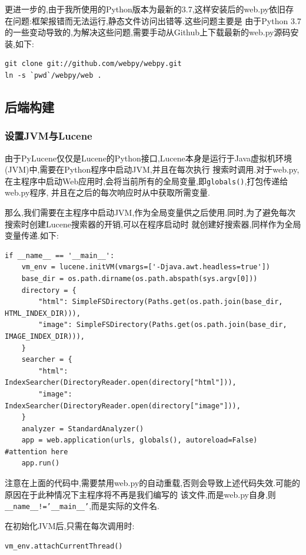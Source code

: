 \documentclass[a4paper]{article}
\begin{document}
更进一步的,由于我所使用的Python版本为最新的3.7,这样安装后的web.py依旧存在问题:框架报错而无法运行,静态文件访问出错等.这些问题主要是
由于Python 3.7的一些变动导致的,为解决这些问题,需要手动从Github上下载最新的web.py源码安装,如下:
\begin{verbatim}
git clone git://github.com/webpy/webpy.git
ln -s `pwd`/webpy/web .
\end{verbatim}
        \subsection{后端构建}
            \subsubsection{设置JVM与Lucene}
由于PyLucene仅仅是Lucene的Python接口,Lucene本身是运行于Java虚拟机环境(JVM)中,需要在Python程序中启动JVM,并且在每次执行
搜索时调用.对于web.py,在主程序中启动Web应用时,会将当前所有的全局变量,即\texttt{globals()},打包传递给web.py程序,
并且在之后的每次响应时从中获取所需变量.

那么,我们需要在主程序中启动JVM,作为全局变量供之后使用.同时,为了避免每次搜索时创建Lucene搜索器的开销,可以在程序启动时
就创建好搜索器,同样作为全局变量传递.如下:
\begin{verbatim}
if __name__ == '__main__':
    vm_env = lucene.initVM(vmargs=['-Djava.awt.headless=true'])
    base_dir = os.path.dirname(os.path.abspath(sys.argv[0]))
    directory = {
        "html": SimpleFSDirectory(Paths.get(os.path.join(base_dir, HTML_INDEX_DIR))),
        "image": SimpleFSDirectory(Paths.get(os.path.join(base_dir, IMAGE_INDEX_DIR))),
    }
    searcher = {
        "html": IndexSearcher(DirectoryReader.open(directory["html"])),
        "image": IndexSearcher(DirectoryReader.open(directory["image"])),
    }
    analyzer = StandardAnalyzer()
    app = web.application(urls, globals(), autoreload=False) #attention here
    app.run()
\end{verbatim}

注意在上面的代码中,需要禁用web.py的自动重载,否则会导致上述代码失效.可能的原因在于此种情况下主程序将不再是我们编写的
该文件,而是web.py自身,则\texttt{__name__!='__main__'},而是实际的文件名.

在初始化JVM后,只需在每次调用时:
\begin{verbatim}
vm_env.attachCurrentThread()
\end{verbatim}
\end{document}
